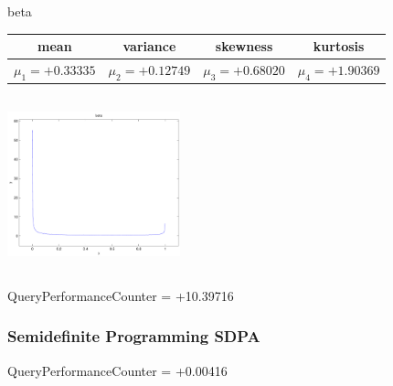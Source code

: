 \documentclass[9pt]{article}
\theoremstyle{plain}
\theoremstyle{definition}
\theoremstyle{remark}
\numberwithin{equation}{section}
\begin{document}
\newpage
beta \begin{tabular}{|c|c|c|c|}  mean & variance & skewness & kurtosis \\  \hline
$\mu_1 = +0.33335$ & $\mu_2 = +0.12749$ & $\mu_3 = +0.68020$ & $\mu_4 =+1.90369$ \\
\end{tabular}

\includegraphics[width=5cm,height=5cm]{beta.pdf}

QueryPerformanceCounter  =  +10.39716
\subsubsection{Semidefinite Programming SDPA}
QueryPerformanceCounter  =  +0.00416
\end{document}
